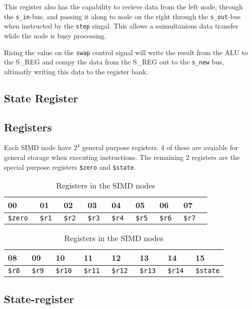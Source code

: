 This register also has the capability to recieve data from the left node,
through the {\tt s\_in}-bus, and passing it along to node on the right through
the {\tt s\_out}-bus when instructed by the {\tt step} singal. This allows a
suimultanious data transfer while the node is busy processing.

Rising the value on the {\tt swap} control signal will write the result from the
ALU to the S\_REG and compy the data from the S\_REG out to the {\tt s\_new}
bus, ultimatly writing this data to the register bank.

\subsection{State Register}

\subsection{Registers}
Each SIMD node have $2^4$ general purpose registers. 4 of these are avaiable for
general storage when executing instructions. The remaining 2 registers are the
special purpose registers {\tt \$zero} and {\tt \$state}.

\begin{table}[h] %
  \centering
  \begin{tabularx}{\linewidth}{XXXXXXXXX}\toprule
    00 & 01 & 02 & 03 & 04 & 05 & 06 & 07 \\ \midrule
    \tt \$zero & \tt \$r1 & \tt \$r2 & \tt \$r3 & \tt \$r4 & \tt \$r5 &
    \tt \$r6 & \tt \$r7\\ \bottomrule
  \end{tabularx}
  \begin{tabularx}{\linewidth}{XXXXXXXX}\toprule
    08 & 09 & 10 & 11 & 12 & 13 & 14 & 15 \\ \midrule
    \tt \$r8 & \tt \$r9 & \tt \$r10 & \tt \$r11 & \tt \$r12 & \tt \$r13 &
    \tt \$r14 & \tt \$state\\ \bottomrule
  \end{tabularx}
  \caption{Registers in the SIMD nodes}
  \label{tab:simd-registers}
\end{table}

\subsection{State-register}

